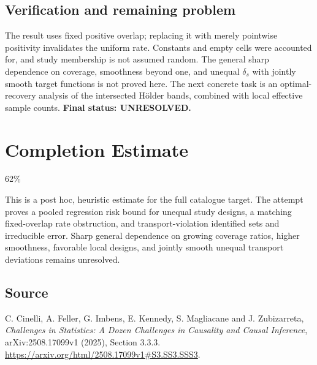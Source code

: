 \documentclass[11pt]{article}
\begin{document}
\subsection*{Verification and remaining problem}
The result uses fixed positive overlap; replacing it with merely pointwise
positivity invalidates the uniform rate. Constants and empty cells were
accounted for, and study membership is not assumed random. The general
sharp dependence on coverage, smoothness beyond one, and unequal
$\delta_s$ with jointly smooth target functions is not proved here.
The next concrete task is an optimal-recovery analysis of the intersected
H\"older bands, combined with local effective sample counts.
\textbf{Final status: UNRESOLVED.}

\section{Completion Estimate}
62\%

This is a post hoc, heuristic estimate for the full catalogue target.
The attempt proves a pooled regression risk bound for unequal study designs, a matching fixed-overlap rate obstruction, and transport-violation identified sets and irreducible error. Sharp general dependence on growing coverage ratios, higher smoothness, favorable local designs, and jointly smooth unequal transport deviations remains unresolved.

\subsection*{Source}
C. Cinelli, A. Feller, G. Imbens, E. Kennedy, S. Magliacane and J. Zubizarreta,
\emph{Challenges in Statistics: A Dozen Challenges in Causality and Causal
Inference}, arXiv:2508.17099v1 (2025), Section 3.3.3.
\url{https://arxiv.org/html/2508.17099v1#S3.SS3.SSS3}.
\end{document}
